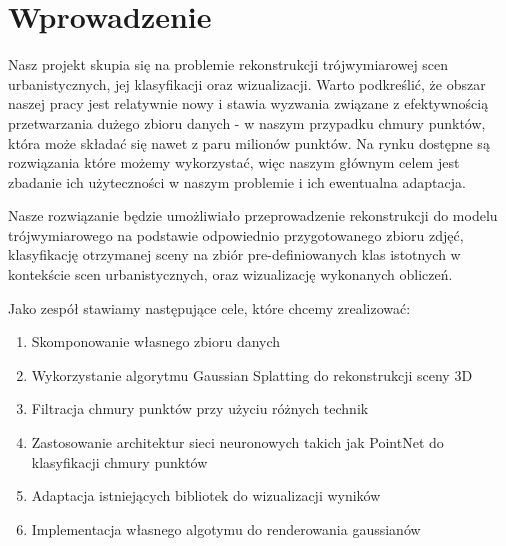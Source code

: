 \section{Wprowadzenie}
Nasz projekt skupia się na problemie rekonstrukcji trójwymiarowej scen urbanistycznych, jej klasyfikacji oraz wizualizacji. Warto podkreślić, że obszar naszej pracy jest relatywnie nowy i stawia wyzwania związane z efektywnością przetwarzania dużego zbioru danych - w naszym przypadku chmury punktów, która może składać się nawet z paru milionów punktów. Na rynku dostępne są rozwiązania które możemy wykorzystać, więc naszym głównym celem jest zbadanie ich użyteczności w naszym problemie i ich ewentualna adaptacja. 

Nasze rozwiązanie będzie umożliwiało przeprowadzenie rekonstrukcji do modelu trójwymiarowego na podstawie odpowiednio przygotowanego zbioru zdjęć, klasyfikację otrzymanej sceny na zbiór pre-definiowanych klas istotnych w kontekście scen urbanistycznych, oraz wizualizację wykonanych obliczeń. 

Jako zespół stawiamy następujące cele, które chcemy zrealizować:

\begin{enumerate}
    \item Skomponowanie własnego zbioru danych 
    \item Wykorzystanie algorytmu Gaussian Splatting do rekonstrukcji sceny 3D
    \item Filtracja chmury punktów przy użyciu różnych technik 
    \item Zastosowanie architektur sieci neuronowych takich jak PointNet do klasyfikacji chmury punktów 
    \item Adaptacja istniejących bibliotek do wizualizacji wyników 
    \item Implementacja własnego algotymu do renderowania gaussianów
\end{enumerate}